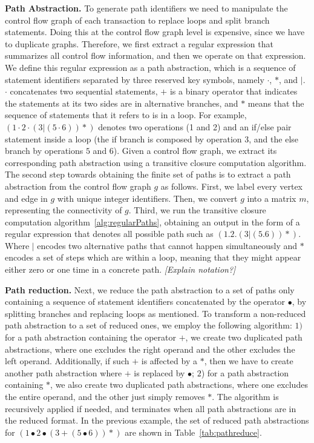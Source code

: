 {\bf Path Abstraction.}
To generate path identifiers we need
to manipulate the control flow graph of each
transaction to replace loops and split branch statements.
Doing this at the control flow graph level is
expensive, since we have to duplicate graphs. Therefore, we 
first extract a regular expression that summarizes
all control flow information, and then we operate on that expression. We define
this regular expression as a path abstraction, which is a sequence 
of statement identifiers separated by three reserved key symbols, namely $\cdot$,
$*$, and $|$. $\cdot$ concatenates two sequential statements,
$+$ is a binary operator that indicates the statements at its two sides
are in alternative branches, and $*$ means that the sequence of
statements that it refers to is in a loop. For example,
$(1\cdot2\cdot(3|(5\cdot6))*)$  denotes two operations (1 and 2) and an if/else pair statement inside
a loop (the if branch is composed by operation $3$, and the else branch by operations $5$ and $6$). Given a control flow graph, we extract its corresponding
path abstraction using a 
transitive closure computation algorithm.
\if
The second step towards obtaining the finite set of paths is to
extract a path abstraction from the control flow graph $g$ as follows. First, we label every vertex and edge
in $g$ with unique integer identifiers. Then, we convert $g$ into 
a matrix $m$, representing the connectivity of $g$. Third, we run the 
transitive closure computation algorithm~\ref{alg:regularPaths}, obtaining an output in the form 
of a regular expression that denotes all possible path such as $(1.2.(3|(5.6))*)$. Where $|$ encodes two alternative paths that cannot happen simultaneously and $*$ encodes a set of steps which are within a loop, meaning that they might appear either zero or one time in a concrete path. {\em [Explain notation?]}
\fi

{\bf Path reduction.} 
Next, we reduce the
path abstraction to a set of paths only containing a sequence of statement identifiers concatenated
by the operator $\bullet$, by splitting branches and replacing loops as
mentioned. To transform a non-reduced path abstraction to a set of reduced ones,
we employ the following algorithm: $1)$ for a path abstraction
containing the operator $+$, we create two duplicated
path abstractions, where one excludes the right operand and the other
excludes the left operand. Additionally, if such $+$ is affected by
a $*$, then we have to create another path abstraction where $+$ is
replaced by $\bullet$; $2$) for a path abstraction containing $*$,
we also create two duplicated path abstractions, where one excludes
the entire operand, and the other just simply removes $*$. The algorithm is
recursively applied if needed, and terminates
when all path abstractions are in the reduced format.
In the previous example, the set of reduced path abstractions 
for $(1\bullet2\bullet(3+(5\bullet6))*)$ are shown in Table~\ref{tab:pathreduce}.


